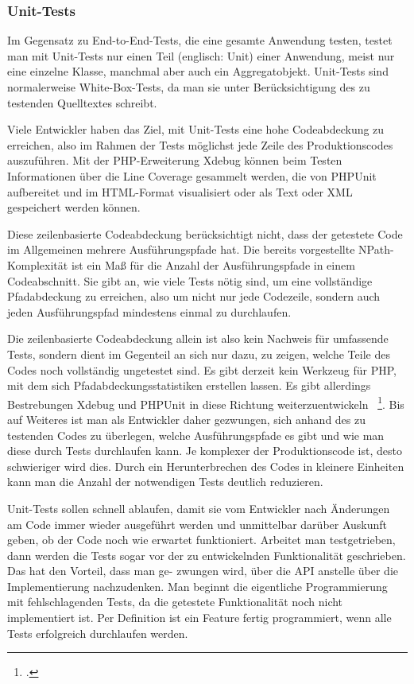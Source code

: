 \subsubsection{Unit-Tests}
Im Gegensatz zu End-to-End-Tests, die eine gesamte Anwendung testen, testet man mit
Unit-Tests nur einen Teil (englisch: Unit) einer Anwendung, meist nur eine einzelne Klasse,
manchmal aber auch ein Aggregatobjekt. Unit-Tests sind normalerweise White-Box-Tests,
da man sie unter Berücksichtigung des zu testenden Quelltextes schreibt.

Viele Entwickler haben das Ziel, mit Unit-Tests eine hohe Codeabdeckung zu erreichen, also
im Rahmen der Tests möglichst jede Zeile des Produktionscodes auszuführen. Mit der
PHP-Erweiterung Xdebug können beim Testen Informationen über die Line Coverage gesammelt
werden, die von PHPUnit aufbereitet und im HTML-Format visualisiert oder als
Text oder XML gespeichert werden können.

Diese zeilenbasierte Codeabdeckung berücksichtigt nicht, dass der getestete Code im
Allgemeinen mehrere Ausführungspfade hat. Die bereits vorgestellte NPath-Komplexität
ist ein Maß für die Anzahl der Ausführungspfade in einem Codeabschnitt. Sie
gibt an, wie viele Tests nötig sind, um eine vollständige Pfadabdeckung zu erreichen, also
um nicht nur jede Codezeile, sondern auch jeden Ausführungspfad mindestens einmal zu
durchlaufen.

Die zeilenbasierte Codeabdeckung allein ist also kein Nachweis für umfassende Tests, sondern
dient im Gegenteil an sich nur dazu, zu zeigen, welche Teile des Codes noch vollständig
ungetestet sind. Es gibt derzeit kein Werkzeug für PHP, mit dem sich Pfadabdeckungsstatistiken
erstellen lassen. Es gibt allerdings Bestrebungen Xdebug und PHPUnit in diese Richtung 
weiterzuentwickeln ~\footcite[Vgl.]{Vergmann.2011}. Bis auf Weiteres ist man als Entwickler
daher gezwungen, sich anhand des zu testenden Codes zu überlegen, welche Ausführungspfade
es gibt und wie man diese durch Tests durchlaufen kann. Je komplexer der Produktionscode ist,
desto schwieriger wird dies. Durch ein Herunterbrechen des Codes in kleinere Einheiten kann 
man die Anzahl der notwendigen Tests deutlich reduzieren.

Unit-Tests sollen schnell ablaufen, damit sie vom Entwickler nach Änderungen am Code
immer wieder ausgeführt werden und unmittelbar darüber Auskunft geben, ob der Code
noch wie erwartet funktioniert. Arbeitet man testgetrieben, dann werden die Tests sogar
vor der zu entwickelnden Funktionalität geschrieben. Das hat den Vorteil, dass man ge-
zwungen wird, über die API anstelle über die Implementierung nachzudenken. Man beginnt
die eigentliche Programmierung mit fehlschlagenden Tests, da die getestete Funktionalität 
noch nicht implementiert ist. Per Definition ist ein Feature fertig programmiert,
wenn alle Tests erfolgreich durchlaufen werden.

